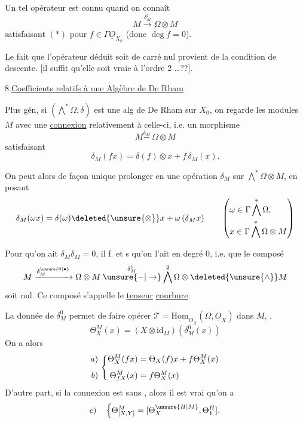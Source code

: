Un tel opérateur est connu quand on connaît
\[
M\xrightarrow{\delta_M^1}\Omega\otimes M
\]
satisfaisant $(*)$  pour $f\in\Gamma\underline O_{X_0}$ (donc $\deg f=0$).

Le fait que l'opérateur déduit  soit de carré nul provient de la condition de descente. [il suffit qu'elle soit vraie à l'ordre 2 \ldots??].

8.\quad \uline{Coefficients relatifs à une Algèbre de De Rham}

Plus gén, si $(\bigwedge^*\Omega,\delta)$ est une alg de De Rham sur $X_0$, on  regarde les modules $M$ avec une \uline{connexion} relativement à celle-ci, i.e. un morphisme
\[
M\overset{\delta_M}{\mathbin{-}}\ \Omega\otimes M
\]
satisfaisant
\[
\delta_M(fx)=\delta(f)\otimes x+f\,\delta_M(x).
\]


On peut alors de façon unique prolonger en une  opération $\delta_M$ sur $\bigwedge^*\Omega\otimes M$, en posant
\[
\delta_M(\omega x)=\delta(\omega)\deleted{\unsure{\otimes}}x+\omega\,(\delta_M x)
\qquad\left(\begin{aligned}
&\omega\in\Gamma\bigwedge^*\Omega,\\
&x\in\Gamma\bigwedge^*\Omega\otimes M
\end{aligned}\right)
\]

Pour qu'on ait $\delta_M\delta_M=0$, il f. et s qu'on l'ait  en degré 0, i.e. que le composé
\[
M\xrightarrow{\delta_M^{\unsure{0|\bullet}}}\Omega\otimes M
\overset{\delta_M^1}{\mathbin{\unsure{-|\to}}}\bigwedge^2\Omega\otimes\deleted{\unsure{\wedge}} M
\]
soit nul. Ce composé s'appelle le \uline{tenseur} \uline{courbure}.

La donnée de  $\delta_M^0$ permet de faire opérer $\mathscr T=\underline{\mathrm{Hom}}_{\underline O_X}(\Omega,\underline O_X)$ dans $M$, .
\[
\Theta_X^M(x)=(X\otimes\mathrm{id}_M)(\delta_M^0(x))
\]
On a alors
\[
\begin{array}{r@{\ }l}
\begin{aligned}a)\\[1ex] b)\end{aligned}&
\left\{\begin{aligned}
\Theta_X^M(fx)&=\Theta_X(f)x+f\Theta_X^M(x)\\[1ex]
\Theta_{fX}^M(x)&=f\Theta_X^M(x)
\end{aligned}\right.
\end{array}
\]
D'autre part, si la connexion est sans , alors il est vrai qu'on a
\[
c)\quad\left\{\Theta^M_{[X,Y]}=[\Theta_X^{\unsure{H|M}},\Theta_Y^{H}].\right.
\]

